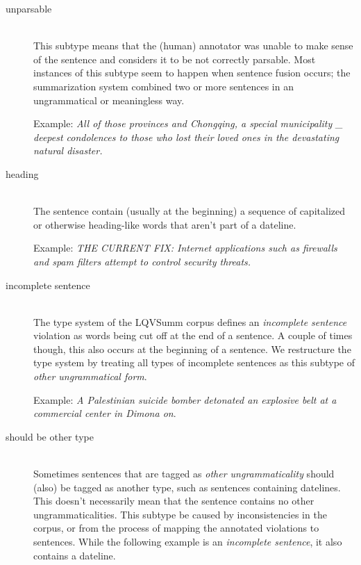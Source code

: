 \documentclass[a4paper,10pt]{scrartcl}
\theoremstyle{style}
\begin{document}
\begin{description}
\item[unparsable]\hfill \\
	This subtype means that the (human) annotator was unable to make sense of the sentence and considers it to be not correctly parsable. Most instances of this subtype seem to happen when sentence fusion occurs; the summarization system combined two or more sentences in an ungrammatical or meaningless way.

	Example: \textit{All of those provinces and Chongqing, a special municipality \_ deepest condolences to those who lost their loved ones in the devastating natural disaster.}

\item[heading] \hfill \\
	The sentence contain (usually at the beginning) a sequence of capitalized or otherwise heading-like words that aren't part of a dateline.

	Example: \textit{THE CURRENT FIX: Internet applications such as firewalls and spam filters attempt to control security threats.}

\item[incomplete sentence] \hfill \\
	The type system of the LQVSumm corpus \citep{friedrichlqvsumm} defines an \textit{incomplete sentence} violation as words being cut off at the end of a sentence. A couple of times though, this also occurs at the beginning of a sentence. We restructure the type system by treating all types of incomplete sentences as this subtype of \textit{other ungrammatical form}.

	Example: \textit{A Palestinian suicide bomber detonated an explosive belt at a \\commercial center in Dimona on}.
\item[should be other type] \hfill \\
	Sometimes sentences that are tagged as \textit{other ungrammaticality} should (also) be tagged as another type, such as sentences containing datelines. This doesn't necessarily mean that the sentence contains no other ungrammaticalities. This subtype be caused by inconsistencies in the corpus, or from the process of mapping the annotated violations to sentences. While the following example is an \textit{incomplete sentence}, it also contains a dateline.


\end{description}
\end{document}
